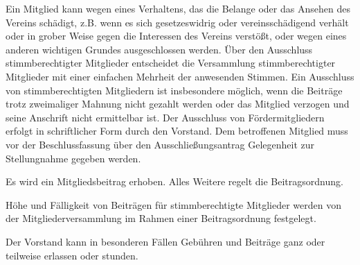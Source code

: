 \begin{contract}
    Ein Mitglied kann wegen eines Verhaltens, das die Belange oder das Ansehen des Vereins schädigt, z.B. wenn es sich gesetzeswidrig oder vereinsschädigend verhält oder in grober Weise gegen die Interessen des Vereins verstößt, oder wegen eines anderen wichtigen Grundes ausgeschlossen werden. Über den Ausschluss stimmberechtigter Mitglieder entscheidet die Versammlung stimmberechtigter Mitglieder mit einer einfachen Mehrheit der anwesenden Stimmen. Ein Ausschluss von stimmberechtigten Mitgliedern ist insbesondere möglich, wenn die Beiträge trotz zweimaliger Mahnung nicht gezahlt werden oder das Mitglied verzogen und seine Anschrift nicht ermittelbar ist. Der Ausschluss von Fördermitgliedern erfolgt in schriftlicher Form durch den Vorstand. Dem betroffenen Mitglied muss vor der Beschlussfassung über den Ausschließungsantrag Gelegenheit zur Stellungnahme gegeben werden.
    \label{ausschluss}

    Es wird ein Mitgliedsbeitrag erhoben. Alles Weitere regelt die Beitragsordnung.

    Höhe und Fälligkeit von Beiträgen für stimmberechtigte Mitglieder werden von der Mitgliederversammlung im Rahmen einer Beitragsordnung festgelegt.

    Der Vorstand kann in besonderen Fällen Gebühren und Beiträge ganz oder teilweise erlassen oder stunden.

\end{contract}


